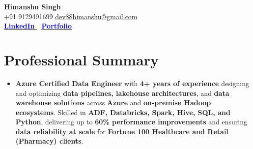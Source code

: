 \documentclass[letterpaper,11pt]{article}
\begin{document}
\begin{center}
    \textbf{\Huge Himanshu Singh} \\ \vspace{1pt}
    \small +91 9129491699 \textbar{} \href{mailto:dev88himanshu@gmail.com}{{dev88himanshu@gmail.com}}    \\ 
    \small  
    \href{https://www.linkedin.com/in/himanshups1/}{\underline{\textcolor{blue}{\textbf{LinkedIn}{ \faExternalLink}}}} \,\textbar{}\, 
    \href{https://drive.google.com/file/d/1X2s_mfXOKdozh9_wLCA6aEJ7sXdkxCG3/view?usp=sharing}{\underline{\textcolor{blue}{\textbf{Portfolio}{ \faExternalLink}}}}
\end{center}


\section{Professional Summary}
\begin{itemize}[leftmargin=0.15in, label={}]
  \item 
  \textbf{Azure Certified Data Engineer} with \textbf{4+ years of experience} designing and optimizing \textbf{data pipelines, lakehouse architectures}, and \textbf{data warehouse solutions} across \textbf{Azure} and \textbf{on-premise Hadoop ecosystems}. Skilled in \textbf{ADF, Databricks, Spark, Hive, SQL, and Python}, delivering up to \textbf{60\% performance improvements} and ensuring \textbf{data reliability at scale} for \textbf{Fortune 100 Healthcare and Retail (Pharmacy) clients}.
\end{itemize}


\end{document}
